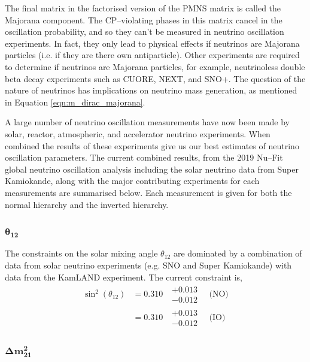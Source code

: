 The final matrix in the factorised version of the PMNS matrix is called the 
Majorana component. The CP--violating phases in this matrix cancel in the 
oscillation probability, and so they can't be measured in neutrino oscillation 
experiments.  In fact, they only lead to physical effects if neutrinos are 
Majorana particles (i.e. if they are there own antiparticle). Other experiments 
are required to determine if neutrinos are Majorana particles, for example, 
neutrinoless double beta decay experiments such as CUORE\cite{Arnaboldi2004}, 
NEXT\cite{Alvarez2012}, and SNO+\cite{Andringa2016}. The question of the 
nature of neutrinos has implications on neutrino mass generation, as mentioned 
in Equation \ref{eqn:m_dirac_majorana}.

A large number of neutrino oscillation measurements have now been made by
solar, reactor, atmospheric, and accelerator neutrino experiments. When combined
the results of these experiments give us our best estimates of neutrino 
oscillation parameters. The current combined results, from the 2019 Nu--Fit
global neutrino oscillation analysis\cite{Esteban:2018azc} including the solar
neutrino data from Super Kamiokande, along with the major contributing 
experiments for each measurements are summarised below. Each measurement is 
given for both the normal hierarchy and the inverted hierarchy.

\subsubsection*{$\boldsymbol{\theta_{12}}$}

The constraints on the solar mixing angle $\theta_{12}$ are dominated by a
combination of data from solar neutrino experiments (e.g. SNO\cite{Ahmad2002}
and Super Kamiokande\cite{PhysRevLett.86.5651}) with data from the KamLAND 
experiment\cite{Araki2005}. The current constraint is,
\begin{align*}
	\sin^2(\theta_{12}) &= 0.310 \mbox{ } \substack{+ 0.013 \\ - 0.012} \quad \mbox{(NO)} \\
	                    &= 0.310 \mbox{ } \substack{+ 0.013 \\ - 0.012} \quad \mbox{(IO)}
\end{align*}

\subsubsection*{$\boldsymbol{\Delta m^2_{21}}$}

